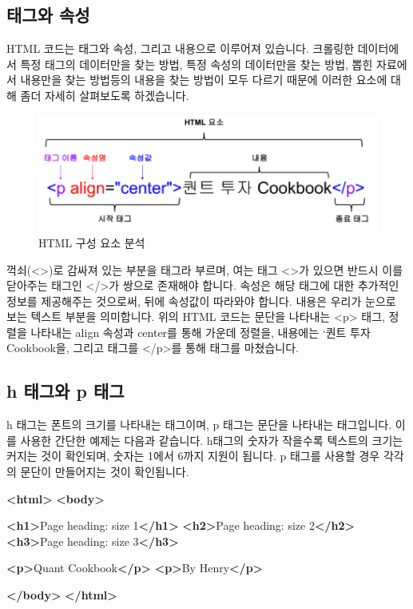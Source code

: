 \documentclass[]{book}
\newenvironment{Shaded}{\begin{snugshade}}{\end{snugshade}}
\newcommand{\KeywordTok}[1]{\textcolor[rgb]{0.13,0.29,0.53}{\textbf{#1}}}
\newcommand{\NormalTok}[1]{#1}
\begin{document}
\hypertarget{section-7}{%
\subsection{태그와 속성}\label{section-7}}

HTML 코드는 태그와 속성, 그리고 내용으로 이루어져 있습니다. 크롤링한 데이터에서 특정 태그의 데이터만을 찾는 방법, 특정 속성의 데이터만을 찾는 방법, 뽑힌 자료에서 내용만을 찾는 방법등의 내용을 찾는 방법이 모두 다르기 때문에 이러한 요소에 대해 좀더 자세히 살펴보도록 하겠습니다.

\begin{figure}

{\centering \includegraphics[width=0.7\linewidth]{images/html_2} 

}

\caption{HTML 구성 요소 분석}\label{fig:unnamed-chunk-10}
\end{figure}

꺽쇠(\textless{}\textgreater{})로 감싸져 있는 부분을 태그라 부르며, 여는 태그 \textless{}\textgreater{}가 있으면 반드시 이를 닫아주는 태그인 \textless{}/\textgreater{}가 쌍으로 존재해야 합니다. 속성은 해당 태그에 대한 추가적인 정보를 제공해주는 것으로써, 뒤에 속성값이 따라와야 합니다. 내용은 우리가 눈으로 보는 텍스트 부분을 의미합니다. 위의 HTML 코드는 문단을 나타내는 \textless{}p\textgreater{} 태그, 정렬을 나타내는 align 속성과 center를 통해 가운데 정렬을, 내용에는 `퀀트 투자 Cookbook을, 그리고 태그를 \textless{}/p\textgreater{}를 통해 태그를 마쳤습니다.

\hypertarget{h--p-}{%
\subsection{h 태그와 p 태그}\label{h--p-}}

h 태그는 폰트의 크기를 나타내는 태그이며, p 태그는 문단을 나타내는 태그입니다. 이를 사용한 간단한 예제는 다음과 같습니다. h태그의 숫자가 작을수록 텍스트의 크기는 커지는 것이 확인되며, 숫자는 1에서 6까지 지원이 됩니다. p 태그를 사용할 경우 각각의 문단이 만들어지는 것이 확인됩니다.

\begin{Shaded}
\begin{Highlighting}[]
\KeywordTok{<html>}
\KeywordTok{<body>}

\KeywordTok{<h1>}\NormalTok{Page heading: size 1}\KeywordTok{</h1>}
\KeywordTok{<h2>}\NormalTok{Page heading: size 2}\KeywordTok{</h2>}
\KeywordTok{<h3>}\NormalTok{Page heading: size 3}\KeywordTok{</h3>}

\KeywordTok{<p>}\NormalTok{Quant Cookbook}\KeywordTok{</p>}
\KeywordTok{<p>}\NormalTok{By Henry}\KeywordTok{</p>}

\KeywordTok{</body>}
\KeywordTok{</html>}
\end{Highlighting}
\end{Shaded}
\end{document}
